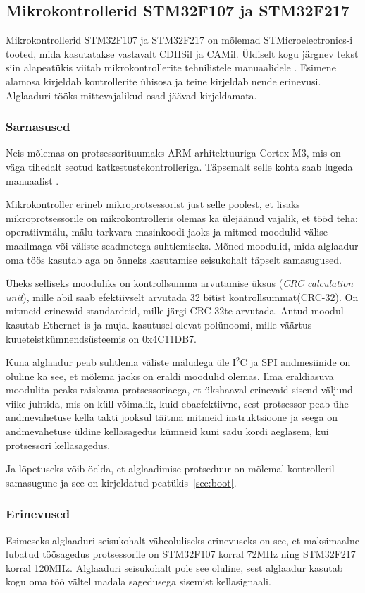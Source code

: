 \documentclass[12pt,a4paper]{article}
\newcommand{\iic}{I\({}^2\)C }
\begin{document}
\subsection{Mikrokontrollerid STM32F107 ja STM32F217}
\label{sec:mcu}
Mikrokontrollerid STM32F107 ja STM32F217 on mõlemad STMicroelectronics-i tooted,
mida kasutatakse vastavalt CDHSil ja CAMil. Üldiselt kogu järgnev tekst siin
alapeatükis viitab mikrokontrollerite tehnilistele manuaalidele
\cite{f1rm,f2rm}. Esimene alamosa kirjeldab kontrollerite ühisosa ja teine
kirjeldab nende erinevusi. Alglaaduri tööks mittevajalikud osad jäävad
kirjeldamata.
\subsubsection{Sarnasused}
Neis mõlemas on protsessorituumaks ARM arhitektuuriga Cortex-M3, mis on väga
tihedalt seotud katkestustekontrolleriga. Täpsemalt selle kohta saab lugeda
manuaalist \cite{CM3pm}.

Mikrokontroller erineb mikroprotsessorist just selle poolest, et lisaks
mikroprotsessorile on mikrokontrolleris olemas ka ülejäänud vajalik, et tööd
teha: operatiivmälu, mälu tarkvara masinkoodi jaoks ja mitmed moodulid välise
maailmaga või väliste seadmetega suhtlemiseks. Mõned moodulid, mida alglaadur
oma töös kasutab aga on õnneks kasutamise seisukohalt täpselt samasugused.

Üheks selliseks mooduliks on kontrollsumma arvutamise üksus (\textit{CRC
calculation unit}), mille abil saab efektiivselt arvutada 32 bitist
kontrollsummat(CRC-32). On mitmeid erinevaid standardeid, mille järgi CRC-32te
arvutada. Antud moodul kasutab Ethernet-is ja mujal kasutusel olevat polünoomi,
mille väärtus kuueteistkümnendsüsteemis on 0x4C11DB7. 

Kuna alglaadur peab suhtlema väliste mäludega üle \iic ja SPI andmesiinide on
oluline ka see, et mõlema jaoks on eraldi moodulid olemas. Ilma eraldiasuva
moodulita peaks raiskama protsessoriaega, et ükshaaval erinevaid sisend-väljund
viike juhtida, mis on küll võimalik, kuid ebaefektiivne, sest protsessor peab
ühe andmevahetuse kella takti jooksul täitma mitmeid instruktsioone ja seega
on andmevahetuse üldine kellasagedus kümneid kuni sadu kordi aeglasem, kui
protsessori kellasagedus.

Ja lõpetuseks võib öelda, et alglaadimise protseduur on mõlemal kontrolleril
samasugune ja see on kirjeldatud peatükis~\ref{sec:boot}.

\subsubsection{Erinevused}
Esimeseks alglaaduri seisukohalt väheoluliseks erinevuseks on see, et
maksimaalne lubatud töösagedus protsessorile on STM32F107 korral 72MHz ning
STM32F217 korral 120MHz. Alglaaduri seisukohalt pole see oluline, sest alglaadur
kasutab kogu oma töö vältel madala sagedusega sisemist kellasignaali.
\end{document}
